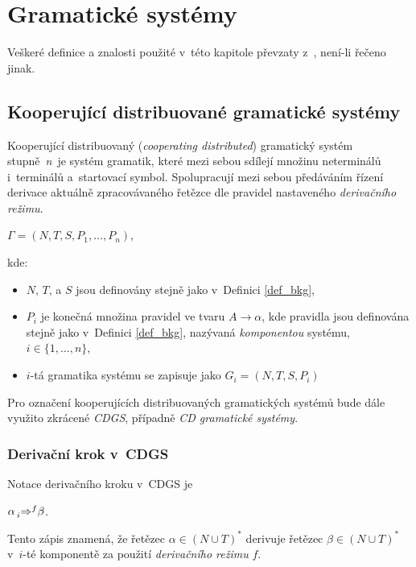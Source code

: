 \chapter{Gramatické systémy}\label{kap_GS}
Veškeré definice a znalosti použité v~této kapitole převzaty z~\cite{CDGS, PCGS, Handbook-Of-Formal-Languages-2}, není-li řečeno jinak.

\section{Kooperující distribuované gramatické systémy}\label{kap_CDGS}

Kooperující distribuovaný (\emph{cooperating distributed}) gramatický systém stupně~\emph{n}~je systém gramatik, které mezi sebou sdílejí množinu neterminálů i~terminálů a~startovací symbol.
Spolupracují mezi sebou předáváním řízení derivace aktuálně zpracovávaného řetězce dle pravidel nastaveného \emph{derivačního režimu}.

\begin{definition}\label{def_cdgs}
\begin{center}
    $\Gamma = (N, T, S, P_1, \ldots ,P_n)$,
\end{center}
kde:
\begin{itemize}
    \item $N$, $T$, a $S$ jsou definovány stejně jako v~Definici \ref{def_bkg},
    \item $P_i$ je konečná množina pravidel ve tvaru $A\rightarrow \alpha$, kde pravidla jsou definována stejně jako v~Definici \ref{def_bkg}, nazývaná \emph{komponentou} systému, $i \in \{1, \ldots, n\}$,
    \item $i$-tá gramatika systému se zapisuje jako $G_i = (N,T,S,P_i)$
\end{itemize}   
\end{definition}

\begin{convention}
    Pro označení kooperujících distribuovaných gramatických systémů bude dále využito zkrácené \emph{CDGS}, případně \emph{CD gramatické systémy}.
\end{convention}

\subsection*{Derivační krok v~CDGS}
Notace derivačního kroku v~CDGS je
\begin{center}
    $\alpha \prescript{}{i}{\Rightarrow}^{f} \beta$.
\end{center}
Tento zápis znamená, že řetězec $\alpha \in (N \cup T)^{*}$ derivuje řetězec $\beta \in (N \cup T)^{*}$ v~$i$-té komponentě za použití \emph{derivačního režimu} $f$.

